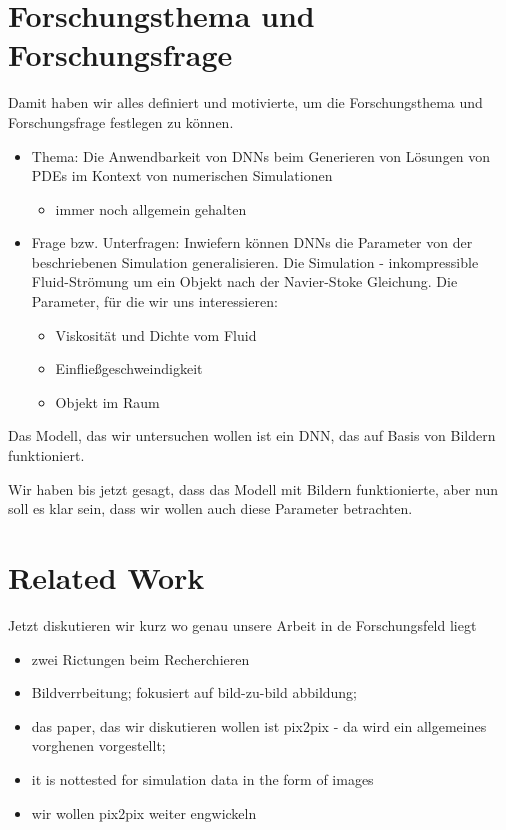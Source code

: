 \documentclass[margin=0.05in, tmargin=0.01in]{article}
\begin{document}
\section{Forschungsthema und Forschungsfrage}
\label{sec:org19a54ef}
Damit haben wir alles definiert und motivierte, um die Forschungsthema und Forschungsfrage festlegen zu können.

\begin{itemize}
\item Thema: Die Anwendbarkeit von DNNs beim Generieren von Lösungen von PDEs im Kontext von numerischen Simulationen
\begin{itemize}
\item immer noch allgemein gehalten
\end{itemize}

\item Frage bzw. Unterfragen: Inwiefern können DNNs die Parameter von der beschriebenen Simulation generalisieren. Die Simulation - inkompressible Fluid-Strömung um ein Objekt nach der Navier-Stoke Gleichung. Die Parameter, für die wir uns interessieren:
\begin{itemize}
\item Viskosität und Dichte vom Fluid
\item Einfließgeschweindigkeit
\item Objekt im Raum
\end{itemize}
\end{itemize}
Das Modell, das wir untersuchen wollen ist ein DNN, das auf Basis von Bildern funktioniert.

Wir haben bis jetzt gesagt, dass das Modell mit Bildern funktionierte, aber nun soll es klar sein, dass wir wollen auch diese Parameter betrachten.

\section{Related Work}
\label{sec:orgf396764}
Jetzt diskutieren wir kurz wo genau unsere Arbeit in de Forschungsfeld liegt
\begin{itemize}
\item zwei Rictungen beim Recherchieren
\item Bildverrbeitung; fokusiert auf bild-zu-bild abbildung;
\item das paper, das wir diskutieren wollen ist pix2pix - da wird ein allgemeines vorghenen vorgestellt;
\item it is nottested for simulation data in the form of images
\item wir wollen pix2pix weiter engwickeln
\end{itemize}
\end{document}
